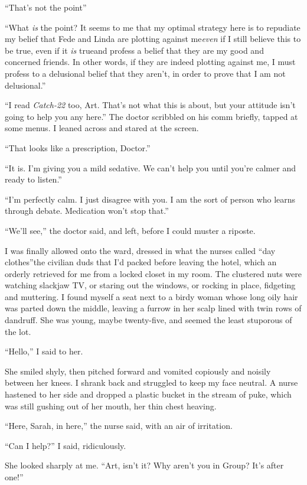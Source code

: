 “That’s not the point{\dash}”

“What \emph{is} the point? It seems to me that my optimal strategy
here is to repudiate my belief that Fede and Linda are plotting
against me{\dash}\emph{even} if I still believe this to be true, even if
it \emph{is} true{\dash}and profess a belief that they are my good and
concerned friends. In other words, if they are indeed plotting
against me, I must profess to a delusional belief that they aren’t,
in order to prove that I am not delusional.”

“I read \emph{Catch-22} too, Art. That’s not what this is about,
but your attitude isn’t going to help you any here.” The doctor
scribbled on his comm briefly, tapped at some menus. I leaned
across and stared at the screen.

“That looks like a prescription, Doctor.”

“It is. I’m giving you a mild sedative. We can’t help you until
you’re calmer and ready to listen.”

“I’m perfectly calm. I just disagree with you. I am the sort of
person who learns through debate. Medication won’t stop that.”

“We’ll see,” the doctor said, and left, before I could muster a
riposte.

I was finally allowed onto the ward, dressed in what the nurses
called “day clothes”{\dash}the civilian duds that I’d packed before
leaving the hotel, which an orderly retrieved for me from a locked
closet in my room. The clustered nuts were watching slackjaw TV, or
staring out the windows, or rocking in place, fidgeting and
muttering. I found myself a seat next to a birdy woman whose long
oily hair was parted down the middle, leaving a furrow in her scalp
lined with twin rows of dandruff. She was young, maybe twenty-five,
and seemed the least stuporous of the lot.

“Hello,” I said to her.

She smiled shyly, then pitched forward and vomited copiously and
noisily between her knees. I shrank back and struggled to keep my
face neutral. A nurse hastened to her side and dropped a plastic
bucket in the stream of puke, which was still gushing out of her
mouth, her thin chest heaving.

“Here, Sarah, in here,” the nurse said, with an air of irritation.

“Can I help?” I said, ridiculously.

She looked sharply at me. “Art, isn’t it? Why aren’t you in Group?
It’s after one!”

